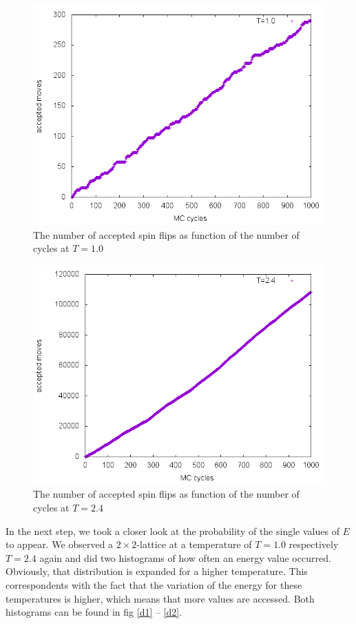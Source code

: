 \documentclass[10pt,a4paper]{article}
\begin{document}
\begin{figure}[h]
	\includegraphics[width=\textwidth]{b1.png}
	\caption{The number of accepted spin flips as function of the number of cycles at $T=1.0$}
\end{figure}
\begin{figure}[h]
	\includegraphics[width=\textwidth]{b24.png}
	\caption{The number of accepted spin flips as function of the number of cycles at $T=2.4$}
\end{figure}

In the next step, we took a closer look at the probability of the single values of $E$ to appear. We observed a $2\times2$-lattice at a temperature of $T=1.0$ respectively $T=2.4$ again and did two histograms of how often an energy value occurred. Obviously, that distribution is expanded for a higher temperature. This correspondents with the fact that the variation of the energy for these temperatures is higher, which means that more values are accessed. Both histograms can be found in fig \ref{d1} -- \ref{d2}.
\end{document}
